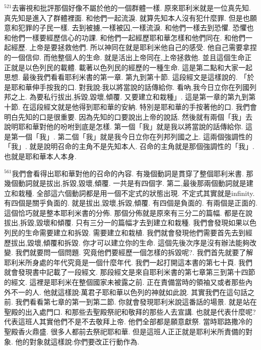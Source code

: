 \documentclass{book}
\begin{document}
$^{521}$去審視和批評那個好像不屬於他的一個群體一樣.
原來耶利米就是一位真先知.
真先知是進入了群體裡面.
和他們一起流淚.
就算先知本人沒有犯什麼罪.
但是也願意和犯罪的子民一樣.
去到被擄,一樣被囚,一樣流淚.
和他們一樣去到恐懼.
恐懼也和他們一樣要經歷信心的功課.
和他們一起經歷耶和華怎樣和他們同在.
和他們一起經歷.
上帝是要拯救他們.
所以神同在就是耶利米他自己的感受.
他自己需要拿捏的一個信仰.
而他整個人的生命.
就是活出上帝同在,上帝拯救他.
並且這個生命正正就是以色列民的載體.
載著以色列民的經歷的一種生命.
這是第二點和大家一起思想.
最後我們看看耶利米書的第一章.
第九到第十節.
這段經文是這樣說的.
「於是耶和華伸手按我的口.
對我說:我以將當說的話傳給你.
看吶,我今日立你在列國列邦之上.
為要私行拔出,拆毀,毀壞,傾覆.
又要建立和栽種」.
這是第一章的第九到第十節.
在這段經文就是他得到耶和華的安納.
特別是耶和華的手按著他的口.
我們會明白先知的口是很重要.
因為先知的口要說出上帝的說話.
然後就有兩個「我」去說明耶和華對他的吩咐到底是怎樣.
第一個「我」就是我以將當說的話傳給你.
這是第一個「我」.
第二個「我」就是我今日立你在列邦列國之上.
這兩個強調性的「我」.
就是說明召命的主角不是先知本人.
召命的主角就是那個強調性的「我」.
也就是耶和華本人本身.

$^{561}$我們會看得出耶和華對他的召命的內容.
有幾個動詞是貫穿了整個耶利米書.
那幾個動詞就是拔出,拆毀,毀壞,傾覆.
一共是有四個字.
第二,最後那兩個動詞就是建立和栽種.
全部這六個動詞都是用一個不定式的狀態出現.
不定式其實就是infinity.
有四個是關乎負面的.
就是拔出,毀壞,拆毀,傾覆.
有四個是負面的.
有兩個是正面的.
這個恰巧就是整本耶利米書的分佈.
那個分佈就是原來有三分二的篇幅.
都是在說拔出,拆毀,毀壞和傾覆.
只有三分一的篇幅才去到建立和栽種.
我們會發現如果以色列民的生命需要建立和拆毀.
需要建立和栽植.
我們就會發現他們需要首先去到經歷拔出,毀壞,傾覆和拆毀.
你才可以建立你的生命.
這個先後次序是沒有辦法能夠改變.
我們就要問一個問題.
究竟他們要經歷一個怎樣的拆毀呢?.
我們首先就要了解耶利米所身處的年代究竟是一個什麼年代.
我們一起打開這本書的第七十頁.
我們就會發現書中記載了一段經文.
那段經文是來自耶利米書的第七章第三到第十四節的經文.
這裡是耶利米在整個國家未被露之前.
正在責備當時的領袖又或者那些內外不一的人.
他就這樣說:萬君子耶和華以色列的神就如此說.
其實我們在這句話之前.
我們看看第七章的第一到第二節.
你就會發現耶利米說這番話的場景.
就是站在聖殿的出入處門口.
和那些去聖殿祭祀和敬拜的那些人去宣講.
也就是代表什麼呢?代表這班人其實他們不是不去敬拜上帝.
他們全部都是願意獻祭.
當時耶路撒冷的聖殿香火鼎盛.
很多人都前去祭祀耶和華.
但是這班人正正就是耶利米所責備的對象.
他的對象就這樣說:你們要改正行動作為.
\end{document}
